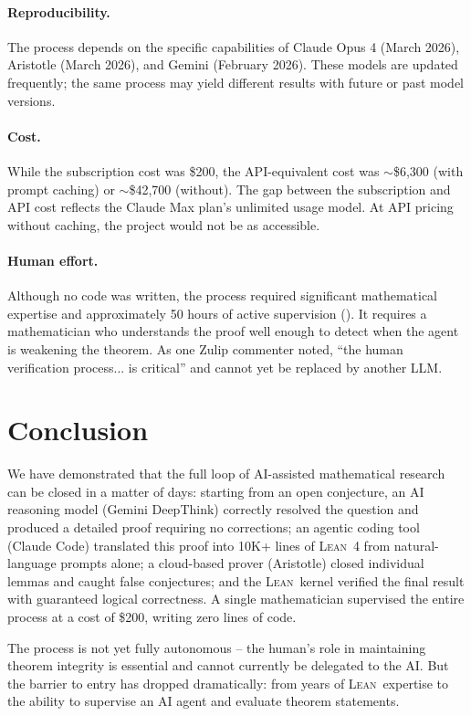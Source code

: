 \documentclass[11pt]{article}
\newcommand{\lean}{\textsc{Lean}}
\begin{document}
\paragraph{Reproducibility.} The process depends on the specific capabilities of Claude Opus 4 (March 2026), Aristotle (March 2026), and Gemini (February 2026). These models are updated frequently; the same process may yield different results with future or past model versions.

\paragraph{Cost.} While the subscription cost was \$200, the API-equivalent cost was $\sim$\$6{,}300 (with prompt caching) or $\sim$\$42{,}700 (without). The gap between the subscription and API cost reflects the Claude Max plan's unlimited usage model. At API pricing without caching, the project would not be as accessible.

\paragraph{Human effort.} Although no code was written, the process required significant mathematical expertise and approximately 50 hours of active supervision (). It requires a mathematician who understands the proof well enough to detect when the agent is weakening the theorem. As one Zulip commenter noted, ``the human verification process... is critical'' and cannot yet be replaced by another LLM.

\section{Conclusion}
\label{sec:conclusion}

We have demonstrated that the full loop of AI-assisted mathematical research can be closed in a matter of days: starting from an open conjecture, an AI reasoning model (Gemini DeepThink) correctly resolved the question and produced a detailed proof requiring no corrections; an agentic coding tool (Claude Code) translated this proof into 10K+ lines of \lean~4 from natural-language prompts alone; a cloud-based prover (Aristotle) closed individual lemmas and caught false conjectures; and the \lean\ kernel verified the final result with guaranteed logical correctness. A single mathematician supervised the entire process at a cost of \$200, writing zero lines of code.

The process is not yet fully autonomous -- the human's role in maintaining theorem integrity is essential and cannot currently be delegated to the AI. But the barrier to entry has dropped dramatically: from years of \lean\ expertise to the ability to supervise an AI agent and evaluate theorem statements.
\end{document}

